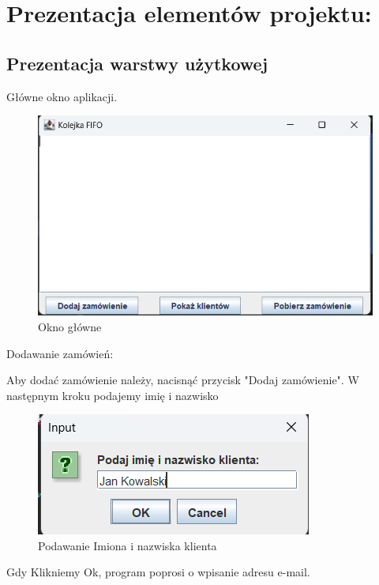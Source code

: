 \chapter{Prezentacja elementów projektu:}
\label{cha:elementyPracy}



\section{Prezentacja warstwy użytkowej}

Główne okno aplikacji.

\begin{figure}[H]
	\centering
	\includegraphics[width=0.7\linewidth]{figures/screenshot001}
	\caption{Okno główne}
	\label{fig:screenshot001}
\end{figure}
 
Dodawanie zamówień:

Aby dodać zamówienie należy, nacisnąć przycisk "Dodaj zamówienie". W następnym kroku podajemy
imię i nazwisko


\begin{figure}[H]
	\centering
	\includegraphics[width=0.7\linewidth]{figures/screenshot002}
	\caption{Podawanie Imiona i nazwiska klienta}
	\label{fig:screenshot002}
\end{figure}
Gdy Klikniemy Ok, program poprosi o wpisanie adresu e-mail.

